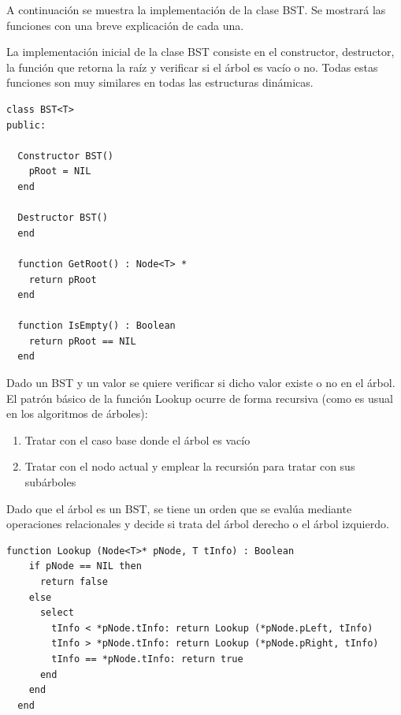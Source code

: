 A continuación se muestra la implementación de la clase BST. Se mostrará las funciones con una breve explicación de cada una.

La implementación inicial de la clase BST consiste en el constructor, destructor, la función que retorna la raíz y verificar si el árbol es vacío o no. Todas estas funciones son muy similares en todas las estructuras dinámicas.

\begin{lstlisting}[upquote=true, language=pseudo]
class BST<T>
public:
  
  Constructor BST()
    pRoot = NIL
  end
  
  Destructor BST()
  end
  
  function GetRoot() : Node<T> *
    return pRoot
  end
  
  function IsEmpty() : Boolean 
    return pRoot == NIL
  end
\end{lstlisting}

Dado un BST y un valor se quiere verificar si dicho valor existe o no en el árbol. El patrón básico de la función Lookup ocurre de forma recursiva (como es usual en los algoritmos de árboles): 
\begin{enumerate}
\item Tratar con el caso base donde el árbol es vacío
\item Tratar con el nodo actual y emplear la recursión para tratar con sus subárboles
\end{enumerate}

Dado que el árbol es un BST, se tiene un orden que se evalúa mediante operaciones relacionales y decide si trata del árbol derecho o el árbol izquierdo.

\begin{lstlisting}[upquote=true, language=pseudo]
  function Lookup (Node<T>* pNode, T tInfo) : Boolean
    if pNode == NIL then
      return false
    else
      select
        tInfo < *pNode.tInfo: return Lookup (*pNode.pLeft, tInfo)
        tInfo > *pNode.tInfo: return Lookup (*pNode.pRight, tInfo)
        tInfo == *pNode.tInfo: return true
      end
    end
  end
\end{lstlisting}


